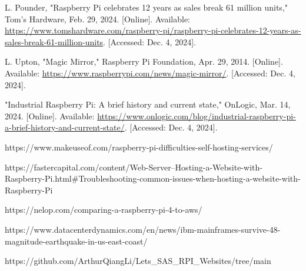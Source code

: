 \documentclass[conference]{IEEEtran}
\begin{document}
\begin{thebibliography}{00}

     L. Pounder, "Raspberry Pi celebrates 12 years as sales break 61 million units," Tom's Hardware, Feb. 29, 2024. [Online]. Available: \url{https://www.tomshardware.com/raspberry-pi/raspberry-pi-celebrates-12-years-as-sales-break-61-million-units}. [Accessed: Dec. 4, 2024].

     L. Upton, "Magic Mirror," Raspberry Pi Foundation, Apr. 29, 2014. [Online]. Available: \url{https://www.raspberrypi.com/news/magic-mirror/}. [Accessed: Dec. 4, 2024].

     "Industrial Raspberry Pi: A brief history and current state," OnLogic, Mar. 14, 2024. [Online]. Available: \url{https://www.onlogic.com/blog/industrial-raspberry-pi-a-brief-history-and-current-state/}. [Accessed: Dec. 4, 2024].

     https://www.makeuseof.com/raspberry-pi-difficulties-self-hosting-services/

     https://fastercapital.com/content/Web-Server--Hosting-a-Website-with-Raspberry-Pi.html\#Troubleshooting-common-issues-when-hosting-a-website-with-Raspberry-Pi

     https://nelop.com/comparing-a-raspberry-pi-4-to-aws/

     https://www.datacenterdynamics.com/en/news/ibm-mainframes-survive-48-magnitude-earthquake-in-us-east-coast/

     https://github.com/ArthurQiangLi/Lets\_SAS\_RPI\_Websites/tree/main


\end{thebibliography}
\end{document}
